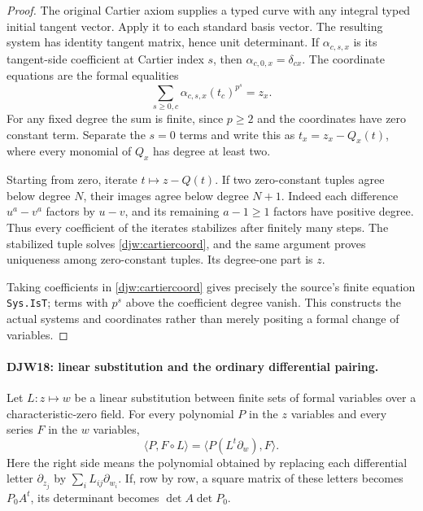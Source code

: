 \documentclass[11pt,a4paper]{article}
\numberwithin{equation}{section}
\theoremstyle{remark}\newtheorem{remark}[theorem]{Remark}
\begin{document}
\begin{proof}
The original Cartier axiom supplies a typed curve with any integral
typed initial tangent vector.  Apply it to each standard basis vector.
The resulting system has identity tangent matrix, hence unit
determinant.  If $\alpha_{c,s,x}$ is its tangent-side coefficient
at Cartier index $s$, then $\alpha_{c,0,x}=\delta_{cx}$.
The coordinate equations are the formal equalities
\begin{equation}
 \sum_{s\ge0,c}\alpha_{c,s,x}(t_c)^{p^s}=z_x.
 \label{djw:cartiercoord}
\end{equation}
For any fixed degree the sum is finite, since $p\ge2$ and the
coordinates have zero constant term.  Separate the $s=0$ terms
and write this as $t_x=z_x-Q_x(t)$, where every monomial of
$Q_x$ has degree at least two.

Starting from zero, iterate $t\mapsto z-Q(t)$.
If two zero-constant tuples agree below degree $N$, their images
agree below degree $N+1$.  Indeed each difference
$u^a-v^a$ factors by $u-v$, and its remaining $a-1\ge1$
factors have positive degree.  Thus every coefficient of the
iterates stabilizes after finitely many steps.  The stabilized
tuple solves \eqref{djw:cartiercoord}, and the same argument
proves uniqueness among zero-constant tuples.  Its degree-one
part is $z$.

Taking coefficients in \eqref{djw:cartiercoord} gives precisely
the source's finite equation \texttt{Sys.\allowbreak Is\allowbreak T}; terms with
$p^s$ above the coefficient degree vanish.  This constructs the
actual systems and coordinates rather than merely positing a
formal change of variables.
\end{proof}

\paragraph{DJW18: linear substitution and the ordinary differential pairing.}
\label{claim:DJW18}
Let $L:z\mapsto w$ be a linear substitution between finite sets
of formal variables over a characteristic-zero field.  For every
polynomial $P$ in the $z$ variables and every series $F$ in the
$w$ variables,
\begin{equation}
 \langle P,F\circ L\rangle
       =\langle P(L^t\partial_w),F\rangle.
 \label{djw:linearjet}
\end{equation}
Here the right side means the polynomial obtained by replacing
each differential letter $\partial_{z_j}$ by
$\sum_iL_{ij}\partial_{w_i}$.  If, row by row, a square matrix
of these letters becomes $P_0A^t$, its determinant becomes
$\det A\det P_0$.
\end{document}
